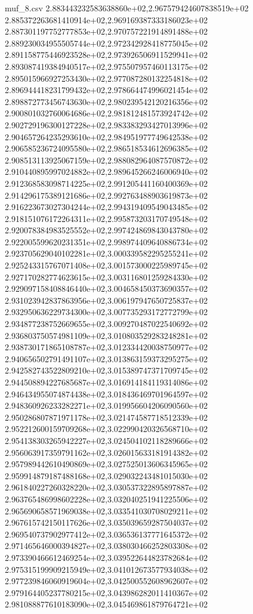 \begin{filecontents*}{muf_8.csv}
2.883443232583638860e+02,2.967579424607838519e+02
2.885372263681410914e+02,2.969169387333186023e+02
2.887301197752777853e+02,2.970757221914891488e+02
2.889230034955505744e+02,2.972342928418775045e+02
2.891158775446923528e+02,2.973926506911529941e+02
2.893087419384940517e+02,2.975507957460113175e+02
2.895015966927253430e+02,2.977087280132254818e+02
2.896944418231799432e+02,2.978664474996021454e+02
2.898872773456743630e+02,2.980239542120216356e+02
2.900801032760064686e+02,2.981812481573924742e+02
2.902729196300127228e+02,2.983383293427013996e+02
2.904657264235293610e+02,2.984951977749642538e+02
2.906585236724095580e+02,2.986518534612696385e+02
2.908513113925067159e+02,2.988082964087570872e+02
2.910440895997024882e+02,2.989645266246006940e+02
2.912368583098714225e+02,2.991205441160400369e+02
2.914296175389121686e+02,2.992763488903619873e+02
2.916223673027304244e+02,2.994319409549043485e+02
2.918151076172264311e+02,2.995873203170749548e+02
2.920078384983525552e+02,2.997424869843043780e+02
2.922005599620231351e+02,2.998974409640886734e+02
2.923705629040102281e+02,3.000339582295255241e+02
2.925243315767071408e+02,3.001573000225989745e+02
2.927170282774623615e+02,3.003116801259284330e+02
2.929097158408846440e+02,3.004658450373690357e+02
2.931023942837863956e+02,3.006197947650725837e+02
2.932950636229734300e+02,3.007735293172772799e+02
2.934877238752669655e+02,3.009270487022540692e+02
2.936803750574981109e+02,3.010803529283248281e+02
2.938730171865108787e+02,3.012334420038750977e+02
2.940656502791491107e+02,3.013863159373295275e+02
2.942582743522809210e+02,3.015389747371709745e+02
2.944508894227685687e+02,3.016914184119314086e+02
2.946434955074874438e+02,3.018436469701964597e+02
2.948360926233282271e+02,3.019956604206090560e+02
2.950286807871971178e+02,3.021474587718512339e+02
2.952212600159709268e+02,3.022990420326568710e+02
2.954138303265942227e+02,3.024504102118289666e+02
2.956063917359791162e+02,3.026015633181914382e+02
2.957989442610490869e+02,3.027525013606345965e+02
2.959914879187488168e+02,3.029032243481015030e+02
2.961840227260328220e+02,3.030537322895897887e+02
2.963765486998602228e+02,3.032040251941225506e+02
2.965690658571969038e+02,3.033541030708029211e+02
2.967615742150117626e+02,3.035039659287504037e+02
2.969540737902977412e+02,3.036536137771645372e+02
2.971465646000394827e+02,3.038030466252803308e+02
2.973390466612469254e+02,3.039522644823782684e+02
2.975315199909215949e+02,3.041012673577934038e+02
2.977239846060919604e+02,3.042500552608962607e+02
2.979164405237780215e+02,3.043986282011410367e+02
2.981088877610183090e+02,3.045469861879764721e+02

\end{filecontents*}
